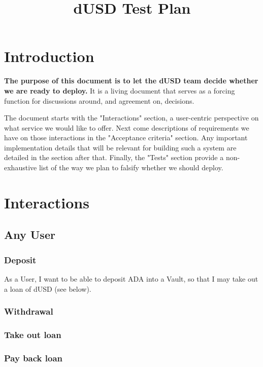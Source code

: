 \documentclass{article} %
\title{dUSD Test Plan}
\begin{document}
\maketitle

\section{Introduction}

\textbf{The purpose of this document is to let the dUSD team decide whether we are ready to deploy.}
It is a living document that serves as a forcing function for discussions around, and agreement on, decisions.

The document starts with the "Interactions" section, a user-centric perspective on what service we would like to offer.
Next come descriptions of requirements we have on those interactions in the "Acceptance criteria" section.
Any important implementation details that will be relevant for building such a system are detailed in the section after that.
Finally, the "Tests" section provide a non-exhaustive list of the way we plan to falsify whether we should deploy.

\section{Interactions}


\subsection{Any User}

\subsubsection{Deposit}

As a User, I want to be able to deposit ADA into a Vault, so that I may take out a loan of dUSD (see below).

\subsubsection{Withdrawal}

\subsubsection{Take out loan}

\subsubsection{Pay back loan}
\end{document}

